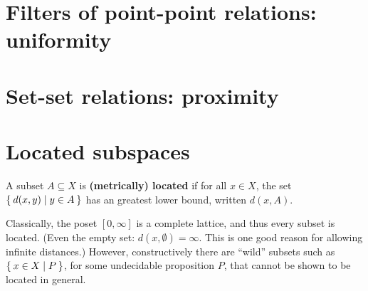 \documentclass{article}
\def\Rp{[0,\infty]}
\begin{document}


\section{Filters of point-point relations: uniformity}
\label{sec:uniformity}


\section{Set-set relations: proximity}
\label{sec:set-set}
\label{sec:proximity}




\section{Located subspaces}
\label{sec:located}

\begin{defn}
  A subset $A\subseteq X$ is \textbf{(metrically) located} if for all $x\in X$, the set $\Set{ d(x,y) | y\in A }$ has an greatest lower bound, written $d(x,A)$.
\end{defn}

Classically, the poset $\Rp$ is a complete lattice, and thus every subset is located.
(Even the empty set: $d(x,\emptyset)=\infty$.
This is one good reason for allowing infinite distances.)
However, constructively there are ``wild'' subsets such as $\Set{x\in X | P}$, for some undecidable proposition $P$, that cannot be shown to be located in general.
\end{document}
